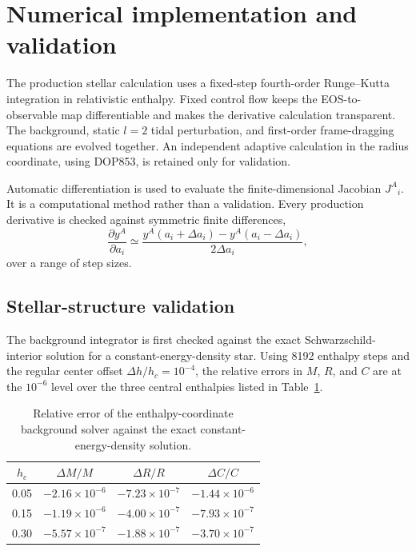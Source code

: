 \section{Numerical implementation and validation}
\label{sec:numerics}

The production stellar calculation uses a fixed-step fourth-order
Runge--Kutta integration in relativistic enthalpy.  Fixed control flow keeps
the EOS-to-observable map differentiable and makes the derivative calculation
transparent.  The background, static \(l=2\) tidal perturbation, and
first-order frame-dragging equations are evolved together.  An independent
adaptive calculation in the radius coordinate, using DOP853, is retained
only for validation.

Automatic differentiation is used to evaluate the finite-dimensional
Jacobian \(J^A{}_i\).  It is a computational method rather than a validation.
Every production derivative is checked against symmetric finite differences,
\begin{equation}
    \frac{\partial y^A}{\partial a_i}
    \simeq
    \frac{
      y^A(a_i+\Delta a_i)
      -
      y^A(a_i-\Delta a_i)}
      {2\Delta a_i},
    \label{eq:fd}
\end{equation}
over a range of step sizes.

\subsection{Stellar-structure validation}

The background integrator is first checked against the exact
Schwarzschild-interior solution for a constant-energy-density star.  Using
8192 enthalpy steps and the regular center offset
\(\Delta h/h_c=10^{-4}\), the relative errors in \(M\), \(R\), and \(C\)
are at the \(10^{-6}\) level over the three central enthalpies listed in
Table~\ref{tab:background-validation}.

\begin{table}[t]
\caption{Relative error of the enthalpy-coordinate background solver against
the exact constant-energy-density solution.}
\label{tab:background-validation}
\begin{ruledtabular}
\begin{tabular}{cccc}
\(h_c\) & \(\Delta M/M\) & \(\Delta R/R\) & \(\Delta C/C\)\\
\hline
0.05 & \(-2.16\times10^{-6}\) & \(-7.23\times10^{-7}\) &
\(-1.44\times10^{-6}\)\\
0.15 & \(-1.19\times10^{-6}\) & \(-4.00\times10^{-7}\) &
\(-7.93\times10^{-7}\)\\
0.30 & \(-5.57\times10^{-7}\) & \(-1.88\times10^{-7}\) &
\(-3.70\times10^{-7}\)
\end{tabular}
\end{ruledtabular}
\end{table}


